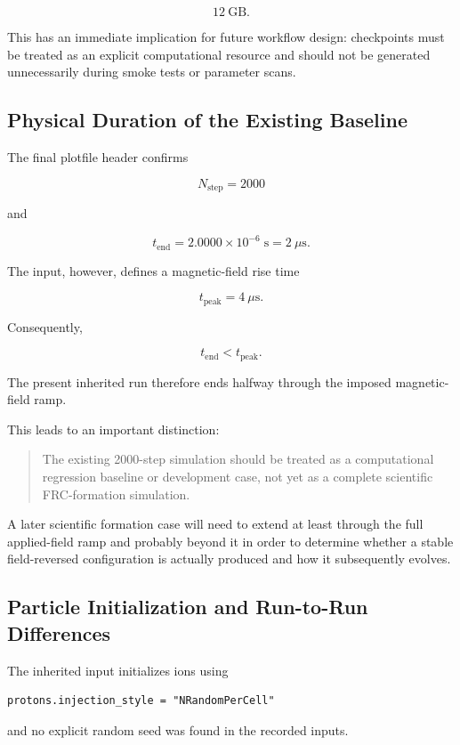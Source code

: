\documentclass[11pt,a4paper]{article}
\begin{document}
\[
12~\mathrm{GB}.
\]

This has an immediate implication for future workflow design: checkpoints must be treated as an explicit computational resource and should not be generated unnecessarily during smoke tests or parameter scans.

\subsection{Physical Duration of the Existing Baseline}

The final plotfile header confirms

\[
N_{\mathrm{step}}=2000
\]

and

\[
t_{\mathrm{end}}
=
2.0000\times10^{-6}\;\mathrm{s}
=
2~\mu\mathrm{s}.
\]

The input, however, defines a magnetic-field rise time

\[
t_{\mathrm{peak}}=4~\mu\mathrm{s}.
\]

Consequently,

\[
t_{\mathrm{end}} < t_{\mathrm{peak}}.
\]

The present inherited run therefore ends halfway through the imposed magnetic-field ramp.

This leads to an important distinction:

\begin{quote}
The existing 2000-step simulation should be treated as a computational regression baseline or development case, not yet as a complete scientific FRC-formation simulation.
\end{quote}

A later scientific formation case will need to extend at least through the full applied-field ramp and probably beyond it in order to determine whether a stable field-reversed configuration is actually produced and how it subsequently evolves.

\subsection{Particle Initialization and Run-to-Run Differences}

The inherited input initializes ions using

\begin{lstlisting}
protons.injection_style = "NRandomPerCell"
\end{lstlisting}

and no explicit random seed was found in the recorded inputs.
\end{document}
